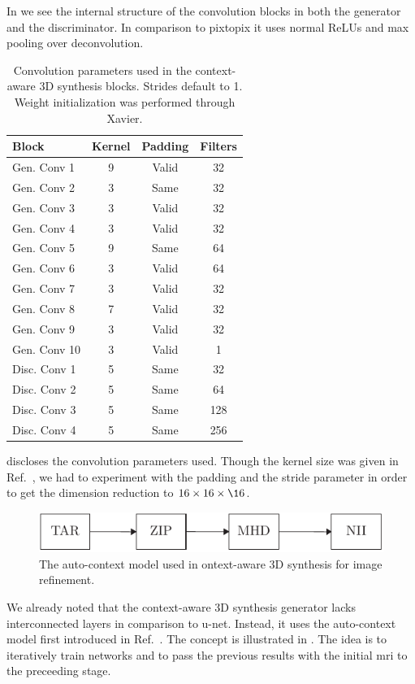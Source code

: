 In  we see the internal structure of the
convolution blocks in both the generator and the discriminator. In comparison
to pixtopix it uses normal ReLUs and max pooling over deconvolution.
\begin{table}[h]
  \centering
  \begin{tabular}{lccc}
    \toprule
    Block         & Kernel  & Padding & Filters \\
    \midrule
    Gen. Conv 1   & \num{9} & Valid   & 32      \\
    Gen. Conv 2   & \num{3} & Same    & 32      \\
    Gen. Conv 3   & \num{3} & Valid   & 32      \\
    Gen. Conv 4   & \num{3} & Valid   & 32      \\
    Gen. Conv 5   & \num{9} & Same    & 64      \\
    Gen. Conv 6   & \num{3} & Valid   & 64      \\
    Gen. Conv 7   & \num{3} & Valid   & 32      \\
    Gen. Conv 8   & \num{7} & Valid   & 32      \\
    Gen. Conv 9   & \num{3} & Valid   & 32      \\
    Gen. Conv 10  & \num{3} & Valid   & 1       \\
    Disc. Conv 1  & \num{5} & Same    & 32      \\
    Disc. Conv 2  & \num{5} & Same    & 64      \\
    Disc. Conv 3  & \num{5} & Same    & 128     \\
    Disc. Conv 4  & \num{5} & Same    & 256     \\
    \bottomrule
  \end{tabular}
  \caption{Convolution parameters used in the context-aware 3D synthesis
    blocks. Strides default to \num{1}. Weight initialization was performed
    through Xavier.
  }\label{tab:synthesis:conv}
\end{table}
 discloses the convolution parameters used. Though
the kernel size was given in Ref.~\cite{Nie16}, we had to experiment with
the padding and the stride parameter in order to get the dimension reduction
to $16\times16\times\16$.
\begin{figure}[h]
  \centering
  \includegraphics[page=10,width=\linewidth]{figure/diagrams.pdf}
  \caption{The auto-context model used in ontext-aware 3D synthesis for
    image refinement.
	}\label{fig:synthesis:refine}
\end{figure}
We already noted that the context-aware 3D synthesis generator lacks
interconnected layers in comparison to u-net. Instead, it uses the
auto-context model first introduced in Ref.~\cite{Tu2010}. The concept is
illustrated in . The idea is to iteratively train
networks and to pass the previous results with the initial \gls{mri} to the
preceeding stage.
